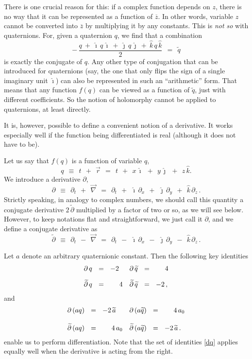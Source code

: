 \documentclass[epsfig,12pt]{article}
\newcommand{\p}{\partial}
\newcommand{\wt}{\widetilde}
\newcommand{\ov}{\overline}
\newcommand{\ii}{\hat\imath}
\newcommand{\jj}{\hat\jmath}
\newcommand{\kk}{\hat k}
\begin{document}
	There is one crucial reason for this: if a complex function depends on $ z $, there is no
	way that it can be represented as a function of $ \ov z $.
	In other words, variable $ z $ cannot be converted into $ \ov z $ by
	multiplying it by any constants.
	This is \emph{not so} with quaternions.
	For, given a quaternion $ q $, we find that a combination
\begin{equation}
	-\, \frac{ q  ~+~  \ii\,q\,\ii  ~+~  \jj\,q\,\jj  ~+~  \kk\,q\,\kk } 2
	~~=~~
	\wt q
\end{equation}
	is exactly the conjugate of $ q $.
	Any other type of conjugation that can be introduced for quaternions (say, the one that
	only flips the sign of a single imaginary unit $ \ii $) can also be represented in such
	an ``arithmetic'' form.
	That means that any function $ f(q) $ can be viewed as a function of $ \wt q $, just
	with different coefficients.
	So the notion of holomorphy cannot be applied to quaternions, at least directly.

	It is, however, possible to define a convenient notion of a derivative.
	It works especially well if the function being differentiated is real (although it does not have to be).

	Let us say that $ f(q) $ is a function of variable $ q $,
\begin{equation}
	q	~~\equiv~~	t  ~~+~~  \vec r	~~=~~	t  ~~+~~  x\,\ii  ~~+~~  y\,\jj  ~~+~~  z\,\kk.
\end{equation}
	We introduce a derivative $ \p $,
\begin{equation}
\label{diff-d}
	\p	~~\equiv~~   \p_t  ~~+~~  \vec\nabla	~~=~~	\p_t  ~~+~~  
								\ii\,\p_x  ~~+~~  \jj\,\p_y  ~~+~~  \kk\,\p_z\,.
\end{equation}
	Strictly speaking, in analogy to complex numbers,
	we should call this quantity a conjugate derivative $ 2\,\wt\p $ multiplied by a factor of two or so,
	as we will see below. However, to keep notations flat and straightforward, we just
	call it $ \p $, and we define a conjugate derivative as
\begin{equation}
\label{diff-d-conj}
	\wt\p	~~\equiv~~   \p_t  ~~-~~  \vec\nabla	~~=~~	\p_t  ~~-~~  
								\ii\,\p_x  ~~-~~  \jj\,\p_y  ~~-~~  \kk\,\p_z\,.
\end{equation}

	Let $ a $ denote an arbitrary quaternionic constant.
	Then the following key identities
\begin{align}
%
\notag
	\p\,q		& ~~=~~		-2		& \p\,\wt q	& ~~=~~		~~~~4\\[2mm]
%
\label{dq}
	\wt\p\,q	& ~~=~~		~~~~4		& \wt\p\,\wt q	& ~~=~~		-2\,,
\end{align}
	and
\begin{align}
%
\notag
	\p\, (a q)	& ~~=~~		-2\,\wt a	& \p\, (a \wt q)	& ~~=~~		~~~~4\,a_0\\[3mm]
%
\label{daq}
	\wt\p\, (a q)	& ~~=~~		~~~~4\,a_0	& \wt\p\, (a \wt q)	& ~~=~~		-2\,\wt a\,.
\end{align}
	enable us to perform differentiation.
	Note that the set of identities \eqref{dq} applies equally well when the derivative is acting from the right.
\end{document}
